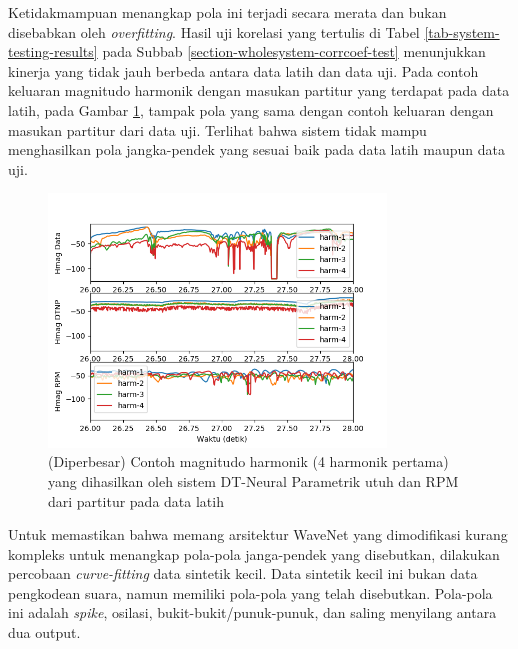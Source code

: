 Ketidakmampuan menangkap pola ini terjadi secara merata dan bukan disebabkan oleh \textit{overfitting}. Hasil uji korelasi yang tertulis di Tabel \ref{tab-system-testing-results} pada Subbab \ref{section-wholesystem-corrcoef-test} menunjukkan kinerja yang tidak jauh berbeda antara data latih dan data uji. Pada contoh keluaran magnitudo harmonik dengan masukan partitur yang terdapat pada data latih, pada Gambar \ref{fig-wholesystem-hmag-output-sample-traindata-zoomed}, tampak pola yang sama dengan contoh keluaran dengan masukan partitur dari data uji. Terlihat bahwa sistem tidak mampu menghasilkan pola jangka-pendek yang sesuai baik pada data latih maupun data uji.

\begin{figure}[htbp]
    \centering
    \includegraphics[width=0.8\textwidth]{resources/Analisis_wholesystem_Hmag_traindata_zoomed.png}
    \caption{(Diperbesar) Contoh magnitudo harmonik (4 harmonik pertama) yang dihasilkan oleh sistem DT-Neural Parametrik utuh dan RPM dari partitur pada data latih}\label{fig-wholesystem-hmag-output-sample-traindata-zoomed}
\end{figure}

Untuk memastikan bahwa memang arsitektur WaveNet yang dimodifikasi kurang kompleks untuk menangkap pola-pola janga-pendek yang disebutkan, dilakukan percobaan \textit{curve-fitting} data sintetik kecil. Data sintetik kecil ini bukan data pengkodean suara, namun memiliki pola-pola yang telah disebutkan. Pola-pola ini adalah \textit{spike}, osilasi, bukit-bukit/punuk-punuk, dan saling menyilang antara dua output.


